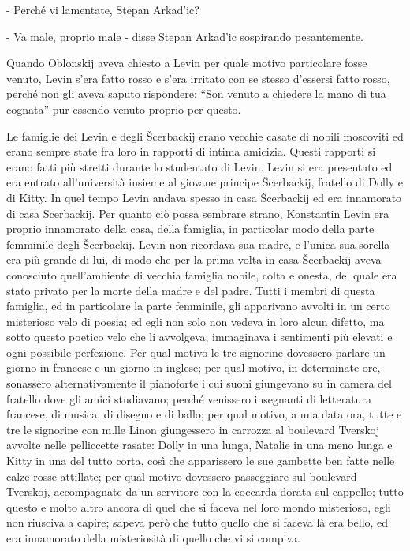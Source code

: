 - Perché vi lamentate, Stepan Arkad'ic? 

- Va male, proprio male - disse Stepan Arkad'ic sospirando pesantemente. 

\label{vi} 

Quando Oblonskij aveva chiesto a Levin per quale motivo particolare fosse venuto, Levin s'era fatto rosso e s'era irritato con se stesso d'essersi fatto rosso, perché non gli aveva saputo rispondere: ``Son venuto a chiedere la mano di tua cognata'' pur essendo venuto proprio per questo. 

Le famiglie dei Levin e degli Šcerbackij erano vecchie casate di nobili moscoviti ed erano sempre state fra loro in rapporti di intima amicizia. Questi rapporti si erano fatti più stretti durante lo studentato di Levin. Levin si era presentato ed era entrato all'università insieme al giovane principe Šcerbackij, fratello di Dolly e di Kitty. In quel tempo Levin andava spesso in casa Šcerbackij ed era innamorato di casa Scerbackij. Per quanto ciò possa sembrare strano, Konstantin Levin era proprio innamorato della casa, della famiglia, in particolar modo della parte femminile degli Šcerbackij. Levin non ricordava sua madre, e l'unica sua sorella era più grande di lui, di modo che per la prima volta in casa Šcerbackij aveva conosciuto quell'ambiente di vecchia famiglia nobile, colta e onesta, del quale era stato privato per la morte della madre e del padre. Tutti i membri di questa famiglia, ed in particolare la parte femminile, gli apparivano avvolti in un certo misterioso velo di poesia; ed egli non solo non vedeva in loro alcun difetto, ma sotto questo poetico velo che li avvolgeva, immaginava i sentimenti più elevati e ogni possibile perfezione. Per qual motivo le tre signorine dovessero parlare un giorno in francese e un giorno in inglese; per qual motivo, in determinate ore, sonassero alternativamente il pianoforte i cui suoni giungevano su in camera del fratello dove gli amici studiavano; perché venissero insegnanti di letteratura francese, di musica, di disegno e di ballo; per qual motivo, a una data ora, tutte e tre le signorine con m.lle Linon giungessero in carrozza al boulevard Tverskoj avvolte nelle pelliccette rasate: Dolly in una lunga, Natalie in una meno lunga e Kitty in una del tutto corta, così che apparissero le sue gambette ben fatte nelle calze rosse attillate; per qual motivo dovessero passeggiare sul boulevard Tverskoj, accompagnate da un servitore con la coccarda dorata sul cappello; tutto questo e molto altro ancora di quel che si faceva nel loro mondo misterioso, egli non riusciva a capire; sapeva però che tutto quello che si faceva là era bello, ed era innamorato della misteriosità di quello che vi si compiva. 

